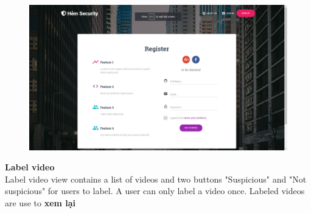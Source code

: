 \begin{figure}[!htb]
\endminipage\hfill
{}
  \includegraphics[width=\linewidth]{images/chap4/signup_form.png}
\endminipage
\end{figure}
\cleardoublepage
\textbf{Label video}
\\
Label video view contains a list of videos and two buttons "Suspicious" and "Not suspicious" for users to label. A user can only label a video once. Labeled videos are use to \textbf{xem lại}
